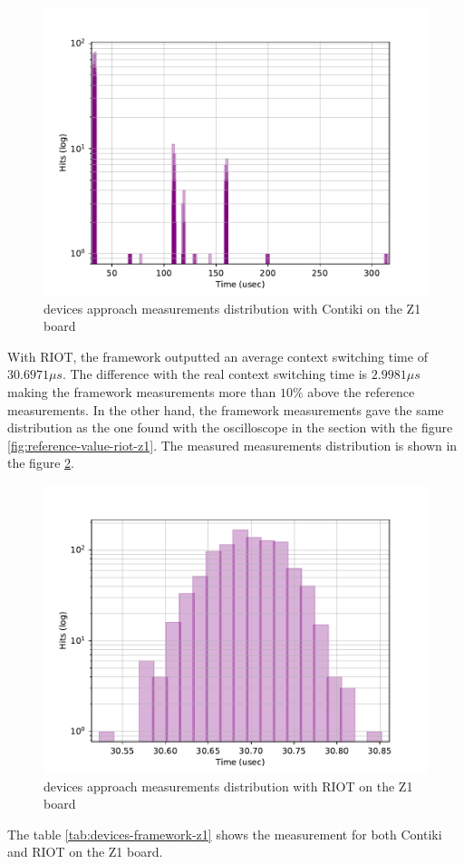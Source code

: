 \begin{figure}[!ht]
      \centering
      \includegraphics[scale=.7]{assets/devices-framework-contiki-z1.pdf}
      \caption{devices approach measurements distribution with Contiki on the Z1 board\label{fig:devices-framework-contiki-z1}}
\end{figure}

With RIOT, the framework outputted an average context switching time of $30.6971\mu s$.
The difference with the real context switching time is $2.9981\mu s$ making the framework measurements more than $10\%$ above the reference measurements.
In the other hand, the framework measurements gave the same distribution as the one found with the oscilloscope in the section \label{sec:ref-measurements} with the figure \ref{fig:reference-value-riot-z1}.
The measured measurements distribution is shown in the figure \ref{fig:devices-framework-riot-z1}.

\begin{figure}[!ht]
      \centering
      \includegraphics[scale=.7]{assets/devices-framework-riot-z1.pdf}
      \caption{devices approach measurements distribution with RIOT on the Z1 board\label{fig:devices-framework-riot-z1}}
\end{figure}

The table \ref{tab:devices-framework-z1} shows the measurement for both Contiki and RIOT on the Z1 board.


